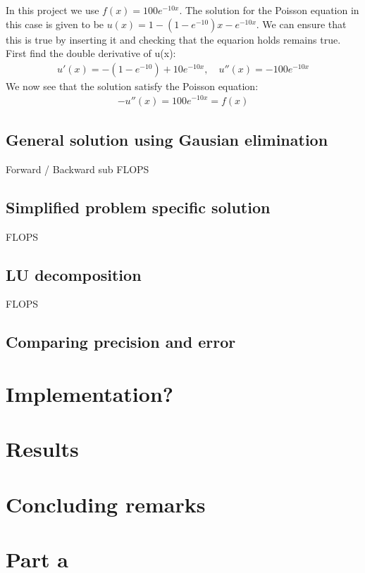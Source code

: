 \documentclass[american,a4paper,12pt]{article}
\begin{document}
  In this project we use $f(x) = 100e^{-10x}$. The solution for the Poisson equation in this case is given to be $u(x) = 1 - (1 - e^{-10})x - e^{-10x}$. We can ensure that this is true by inserting it and checking that the equarion holds remains true. First find the double derivative of u(x):
  \begin{align*}
    u'(x) = -(1 - e^{-10}) + 10e^{-10x}, \quad u''(x) = -100e^{-10x}
  \end{align*}
  We now see that the solution satisfy the Poisson equation:
  \begin{align*}
    -u''(x) = 100e^{-10x} = f(x)
  \end{align*}
  \subsection{General solution using Gausian elimination}
    Forward / Backward sub
    FLOPS
  \subsection{Simplified problem specific solution}
    FLOPS
  \subsection{LU decomposition}
    FLOPS
  \subsection{Comparing precision and error}


\section{Implementation?}
\section{Results}
\section{Concluding remarks}








\section{Part a}
\end{document}

